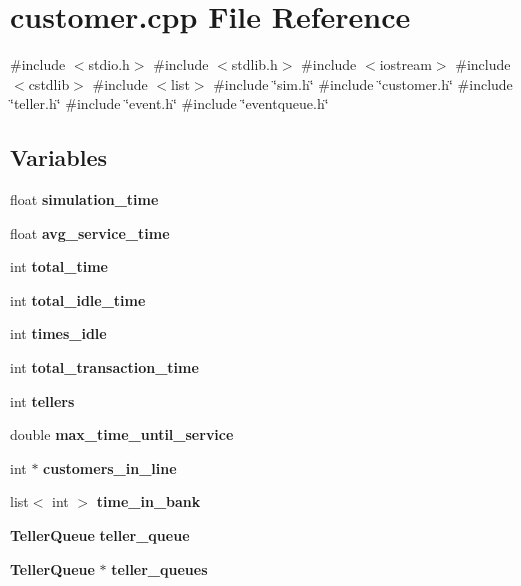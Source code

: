 \section{customer.\+cpp File Reference}
\label{customer_8cpp}
{\ttfamily \#include $<$stdio.\+h$>$}\newline
{\ttfamily \#include $<$stdlib.\+h$>$}\newline
{\ttfamily \#include $<$iostream$>$}\newline
{\ttfamily \#include $<$cstdlib$>$}\newline
{\ttfamily \#include $<$list$>$}\newline
{\ttfamily \#include \char`\"{}sim.\+h\char`\"{}}\newline
{\ttfamily \#include \char`\"{}customer.\+h\char`\"{}}\newline
{\ttfamily \#include \char`\"{}teller.\+h\char`\"{}}\newline
{\ttfamily \#include \char`\"{}event.\+h\char`\"{}}\newline
{\ttfamily \#include \char`\"{}eventqueue.\+h\char`\"{}}\newline
\subsection*{Variables}
\begin{DoxyCompactItemize}
\item 
float \textbf{ simulation\+\_\+time}
\item 
float \textbf{ avg\+\_\+service\+\_\+time}
\item 
int \textbf{ total\+\_\+time}
\item 
int \textbf{ total\+\_\+idle\+\_\+time}
\item 
int \textbf{ times\+\_\+idle}
\item 
int \textbf{ total\+\_\+transaction\+\_\+time}
\item 
int \textbf{ tellers}
\item 
double \textbf{ max\+\_\+time\+\_\+until\+\_\+service}
\item 
int $\ast$ \textbf{ customers\+\_\+in\+\_\+line}
\item 
list$<$ int $>$ \textbf{ time\+\_\+in\+\_\+bank}
\item 
\textbf{ Teller\+Queue} \textbf{ teller\+\_\+queue}
\item 
\textbf{ Teller\+Queue} $\ast$ \textbf{ teller\+\_\+queues}
\end{DoxyCompactItemize}



